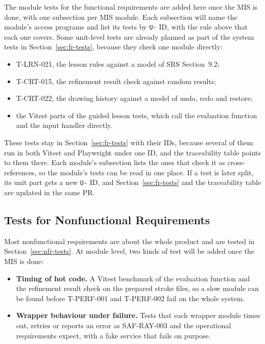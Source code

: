 \documentclass[12pt, titlepage]{article}
\begin{document}
The module tests for the functional requirements are added here once the MIS
is done, with one subsection per MIS module. Each subsection will name the
module's access programs and list its tests by \texttt{U-} ID, with the rule
above that each one covers. Some unit-level tests are already planned as
part of the system tests in Section~\ref{sec:fr-tests}, because they check
one module directly:
\begin{itemize}
\item T-LRN-021, the lesson rules against a model of SRS Section~9.2;
\item T-CRT-015, the refinement result check against random results;
\item T-CRT-022, the drawing history against a model of undo, redo and
restore;
\item the Vitest parts of the guided lesson tests, which call the
evaluation function and the input handler directly.
\end{itemize}
These tests stay in Section~\ref{sec:fr-tests} with their IDs, because
several of them run in both Vitest and Playwright under one ID, and the
traceability table points to them there. Each module's subsection lists the
ones that check it as cross-references, so the module's tests can be read in
one place. If a test is later split, its unit part gets a new \texttt{U-} ID,
and Section~\ref{sec:fr-tests} and the traceability table are updated in the
same PR.

\subsection{Tests for Nonfunctional Requirements}

Most nonfunctional requirements are about the whole product and are tested in
Section~\ref{sec:nfr-tests}. At module level, two kinds of test will be
added once the MIS is done:
\begin{itemize}
\item \textbf{Timing of hot code.} A Vitest benchmark of the evaluation
function and the refinement result check on the prepared stroke files, so a
slow module can be found before T-PERF-001 and T-PERF-002 fail on the whole
system.
\item \textbf{Wrapper behaviour under failure.} Tests that each wrapper
module times out, retries or reports an error as SAF-RAY-003 and the
operational requirements expect, with a fake service that fails on purpose.
\end{itemize}
\end{document}

